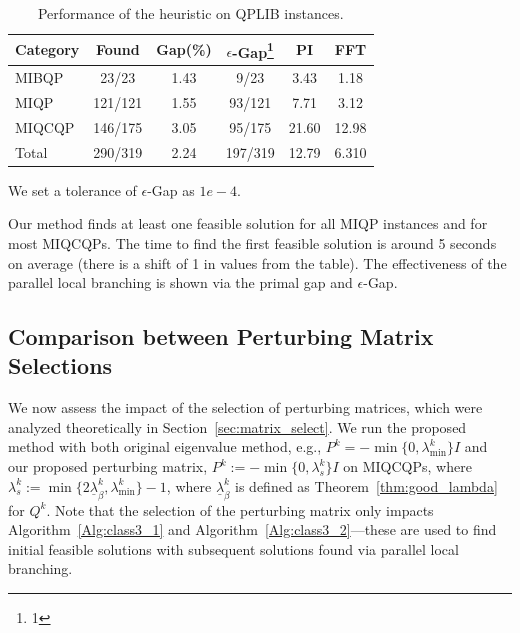 \documentclass[]{article}
\begin{document}
\begin{table}[!htbp]
	\centering
	\setlength{\tabcolsep}{2mm}
	\begin{threeparttable}
		\begin{tabular}{lccccc}
            \toprule[1pt]
            Category &Found  &Gap(\%) &$\epsilon$-Gap\footnote{1} &PI &FFT \\
            \midrule
            MIBQP &23/23 &1.43 &9/23 &3.43 &1.18\\
            MIQP &121/121 &1.55 &93/121 &7.71 &3.12\\
            MIQCQP &146/175 &3.05 &95/175 &21.60 &12.98\\
            \midrule
            Total &290/319 &2.24 &197/319 &12.79 &6.310\\
            \bottomrule[1pt]
        \end{tabular}
		\begin{tablenotes}
			\footnotesize
			\item[1] We set a tolerance of $\epsilon$-Gap as $1e-4$.
		\end{tablenotes}
	\end{threeparttable}
	\caption{Performance of the heuristic on QPLIB instances.}
	\label{tab:res_sum}
\end{table}

Our method finds at least one feasible solution for all MIQP instances and for most MIQCQPs. The time to find the first feasible solution is around 5 seconds on average (there is a shift of 1 in values from the table). The effectiveness of the parallel local branching is shown via the primal gap and $\epsilon$-Gap.

\subsection{Comparison between Perturbing Matrix Selections}\label{sec:comp_matrices}

We now assess the impact of the selection of perturbing matrices, which were analyzed theoretically in Section~\ref{sec:matrix_select}. We run the proposed method with both original eigenvalue method, e.g., $P^k = -\min\{0,\lambda_{\min}^{k}\}I$ and our proposed perturbing matrix, $P^{k}:=-\min\{0,\lambda_{s}^{k}\}I$ on MIQCQPs, where $\lambda_{s}^{k} := \min\{2\underline{\lambda}_{\beta}^k, \lambda_{\min}^{k}\} - 1$, where $\underline{\lambda}_{\beta}^k$ is defined as Theorem~\ref{thm:good_lambda} for $Q^k$. Note that the selection of the perturbing matrix only impacts  Algorithm~\ref{Alg:class3_1} and Algorithm~\ref{Alg:class3_2}---these are used to find initial feasible solutions with subsequent solutions found via parallel local branching. 
\end{document}

